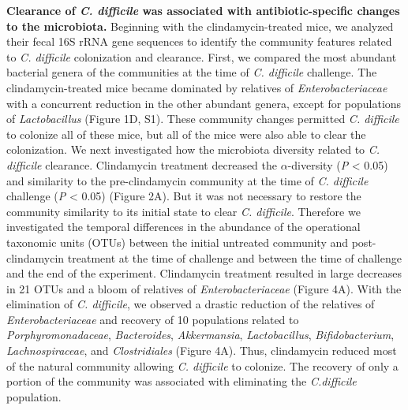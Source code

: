 \documentclass[12pt,]{article}
\begin{document}
\textbf{Clearance of \emph{C. difficile} was associated with
antibiotic-specific changes to the microbiota.} Beginning with the
clindamycin-treated mice, we analyzed their fecal 16S rRNA gene
sequences to identify the community features related to \emph{C.
difficile} colonization and clearance. First, we compared the most
abundant bacterial genera of the communities at the time of \emph{C.
difficile} challenge. The clindamycin-treated mice became dominated by
relatives of \emph{Enterobacteriaceae} with a concurrent reduction in
the other abundant genera, except for populations of
\emph{Lactobacillus} (Figure 1D, S1). These community changes permitted
\emph{C. difficile} to colonize all of these mice, but all of the mice
were also able to clear the colonization. We next investigated how the
microbiota diversity related to \emph{C. difficile} clearance.
Clindamycin treatment decreased the \(\alpha\)-diversity (\emph{P}
\textless{} 0.05) and similarity to the pre-clindamycin community at the
time of \emph{C. difficile} challenge (\emph{P} \textless{} 0.05)
(Figure 2A). But it was not necessary to restore the community
similarity to its initial state to clear \emph{C. difficile}. Therefore
we investigated the temporal differences in the abundance of the
operational taxonomic units (OTUs) between the initial untreated
community and post-clindamycin treatment at the time of challenge and
between the time of challenge and the end of the experiment. Clindamycin
treatment resulted in large decreases in 21 OTUs and a bloom of
relatives of \emph{Enterobacteriaceae} (Figure 4A). With the elimination
of \emph{C. difficile}, we observed a drastic reduction of the relatives
of \emph{Enterobacteriaceae} and recovery of 10 populations related to
\emph{Porphyromonadaceae}, \emph{Bacteroides}, \emph{Akkermansia},
\emph{Lactobacillus}, \emph{Bifidobacterium}, \emph{Lachnospiraceae},
and \emph{Clostridiales} (Figure 4A). Thus, clindamycin reduced most of
the natural community allowing \emph{C. difficile} to colonize. The
recovery of only a portion of the community was associated with
eliminating the \emph{C.difficile} population.
\end{document}
